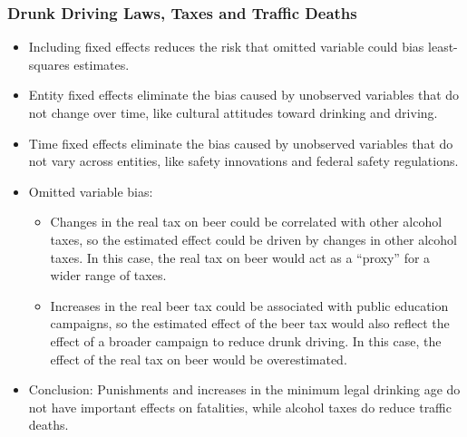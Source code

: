 \begin{frame}
\frametitle{Drunk Driving Laws, Taxes and Traffic Deaths}
\begin{itemize}
\item Including fixed effects reduces the risk that omitted variable could bias least-squares estimates. 
\item Entity fixed effects eliminate the bias caused by unobserved variables that do not change over time, like cultural attitudes toward drinking and driving.  
\item Time fixed effects eliminate the bias caused by unobserved variables that do not vary across entities, like safety innovations and federal safety regulations.
\item Omitted variable bias: 
\begin{itemize}
\item Changes in the real tax on beer could be correlated with other alcohol taxes, so the estimated effect could be driven by changes in other alcohol taxes. In this case, the real tax on beer would act as a ``proxy'' for a wider range of taxes.
\item Increases in the real beer tax could be associated with public education campaigns, so the estimated effect of the beer tax would also reflect the effect of a broader campaign to reduce drunk driving. In this case, the effect of the real tax on beer would be overestimated.
\end{itemize}
\item Conclusion: Punishments and increases in the minimum legal drinking age do not have important effects on fatalities, while alcohol taxes do reduce traffic deaths.
\end{itemize}
\end{frame}

